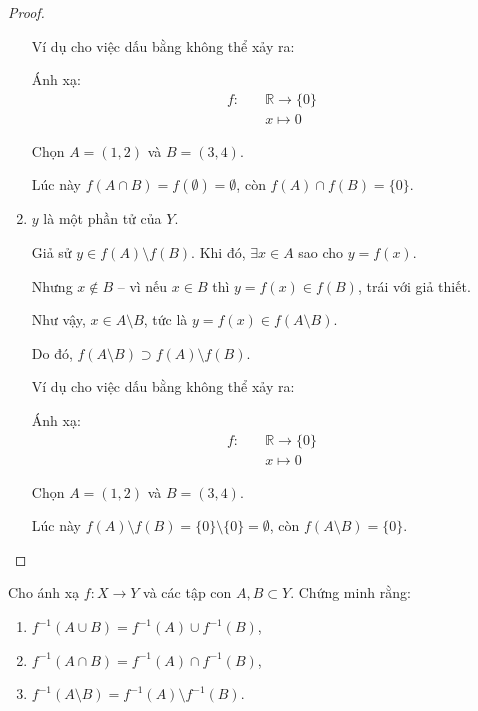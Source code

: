 \documentclass[class=linearalgebra,crop=false]{standalone}
\begin{document}
\begin{proof}
\begin{enumerate}[label = (\alph*)]
              \bigskip
              \par Ví dụ cho việc dấu bằng không thể xảy ra:
              \par Ánh xạ:
              \begin{align*}
                  f:\quad & \mathbb{R}\rightarrow \{0\} \\
                          & x\mapsto 0
              \end{align*}
              \par Chọn $A = (1, 2)$ và $B = (3, 4)$.
              \par Lúc này $f(A\cap B) = f(\emptyset) = \emptyset$, còn $f(A)\cap f(B) = \{ 0 \}$.

        \item $y$ là một phần tử của $Y$.

              \par Giả sử $y\in f(A)\setminus f(B)$. Khi đó, $\exists x\in A$ sao cho $y = f(x)$.
              \par Nhưng $x\not\in B$ -- vì nếu $x\in B$ thì $y = f(x)\in f(B)$, trái với giả thiết.
              \par Như vậy, $x\in A\setminus B$, tức là $y = f(x)\in f(A\setminus B)$.
              \par Do đó, $f(A\setminus B)\supset f(A)\setminus f(B)$.

              \bigskip
              \par Ví dụ cho việc dấu bằng không thể xảy ra:
              \par Ánh xạ:
              \begin{align*}
                  f:\quad & \mathbb{R}\rightarrow \{0\} \\
                          & x\mapsto 0
              \end{align*}
              \par Chọn $A = (1, 2)$ và $B = (3, 4)$.
              \par Lúc này $f(A)\setminus f(B) = \{0\}\setminus \{0\} = \emptyset$, còn $f(A\setminus B) = \{ 0 \}$.
    \end{enumerate}
\end{proof}

\begin{exercise}Cho ánh xạ $f: X\rightarrow Y$ và các tập con $A, B\subset Y$. Chứng minh rằng:
    \begin{enumerate}[itemsep=0pt,label = (\alph*)]
        \item $f^{-1}(A\cup B) = f^{-1}(A)\cup f^{-1}(B)$,
        \item $f^{-1}(A\cap B) = f^{-1}(A)\cap f^{-1}(B)$,
        \item $f^{-1}(A\setminus B) = f^{-1}(A)\setminus f^{-1}(B)$.
    \end{enumerate}
\end{exercise}
\end{document}
